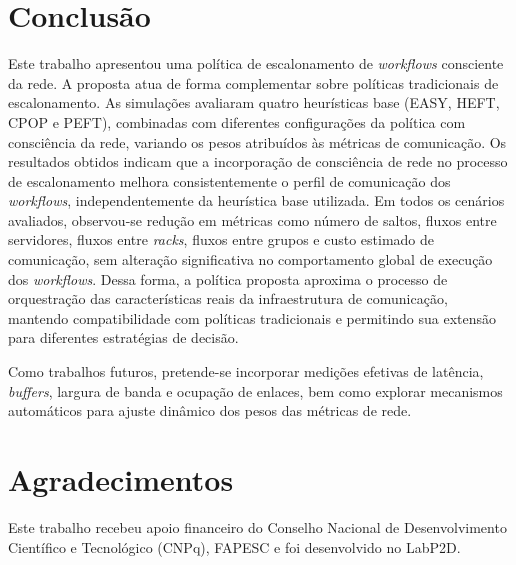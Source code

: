 \documentclass[12pt]{article}
\begin{document}
\section{Conclusão}
\label{sec:conclusao}

Este trabalho apresentou uma política de escalonamento de \textit{workflows} consciente da rede. 
%
A proposta atua de forma complementar sobre políticas tradicionais de escalonamento.
%
As simulações avaliaram quatro heurísticas base (EASY, HEFT, CPOP e PEFT), combinadas com diferentes configurações da política com consciência da rede, variando os pesos atribuídos às métricas de comunicação.
%
Os resultados obtidos indicam que a incorporação de consciência de rede no processo de escalonamento melhora consistentemente o perfil de comunicação dos \textit{workflows}, independentemente da heurística base utilizada. 
%
Em todos os cenários avaliados, observou-se redução em métricas como número de saltos, fluxos entre servidores, fluxos entre \textit{racks}, fluxos entre grupos e custo estimado de comunicação, sem alteração significativa no comportamento global de execução dos \textit{workflows}.
%
Dessa forma, a política proposta aproxima o processo de orquestração das características reais da infraestrutura de comunicação, mantendo compatibilidade com políticas tradicionais e permitindo sua extensão para diferentes estratégias de decisão.

Como trabalhos futuros, pretende-se incorporar medições efetivas de latência, \textit{buffers}, largura de banda e ocupação de enlaces, bem como explorar mecanismos automáticos para ajuste dinâmico dos pesos das métricas de rede. 

\section*{Agradecimentos}
Este trabalho recebeu apoio financeiro do Conselho Nacional de Desenvolvimento Científico e Tecnológico (CNPq), FAPESC e foi desenvolvido no LabP2D.



\end{document}
